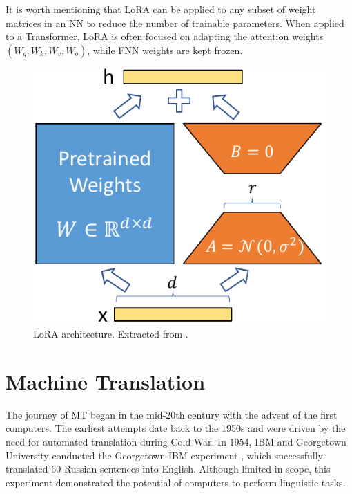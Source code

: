 \documentclass[11pt,english,listoffigures,listoftables]{tfgetsinf}
\begin{document}


It is worth mentioning that LoRA can be applied to any subset of weight matrices in an NN to reduce the number of trainable parameters. When applied to a Transformer, LoRA is often focused on adapting the attention weights $(W_q, W_k, W_v, W_o)$, while FNN weights are kept frozen. 

\begin{figure}[h]
    \centering    \includegraphics[width=0.5\linewidth]{lora.pdf}
    \caption{LoRA architecture. Extracted from \cite{hu2021lora}.}
    \label{fig:lora}
\end{figure}



\section{Machine Translation}

The journey of MT began in the mid-20th century with the advent of the first computers. The earliest attempts date back to the 1950s and were driven by the need for automated translation during Cold War. In 1954, IBM and Georgetown University conducted the Georgetown-IBM experiment \cite{hutchins-2004-georgetown}, which successfully translated 60 Russian sentences into English. Although limited in scope, this experiment demonstrated the potential of computers to perform linguistic tasks.
\end{document}
